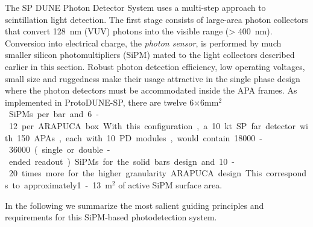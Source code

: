 The SP DUNE Photon Detector System uses a multi-step approach to scintillation light detection.  The first stage consists of large-area photon collectors that convert 128~nm (VUV) photons into the visible range (> 400~nm). Conversion into electrical charge, the {\it photon sensor}, is performed by much smaller
 silicon photomultipliers (SiPM) mated to the light collectors described earlier in this section. Robust photon detection efficiency, low operating voltages, small size and ruggedness make their usage attractive in the single phase design where the photon detectors must be accommodated inside the APA frames. 
As implemented in ProtoDUNE-SP, there are twelve \num{6}$\times$\num{6}\si{mm$^2$} SiPMs per bar and 6-12 per ARAPUCA box. With this configuration, a \SI{10}{kt} SP far detector with \num{150} APAs, each with \num{10} PD modules, would contain \num{18000}-\num{36000} (single or double-ended readout) SiPMs for the solid bars design and 10-20 times more for the higher granularity ARAPUCA design. This corresponds to approximately1-13~m$^2$ of active SiPM surface area.

In the following we summarize the most salient guiding principles and requirements for this SiPM-based photodetection system.


